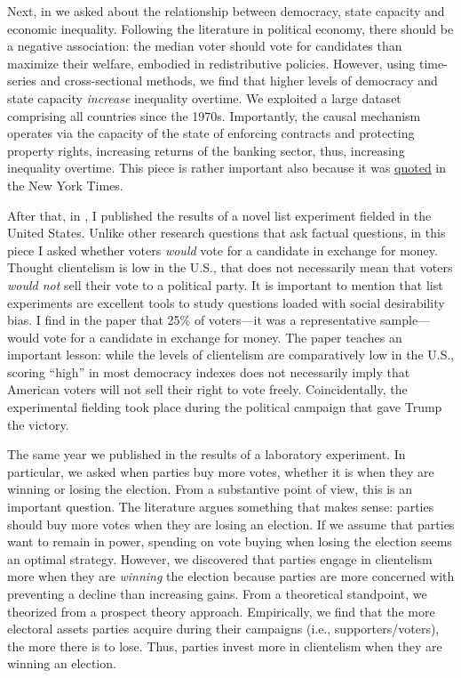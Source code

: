 \documentclass[10pt,stdletter,dateno,sigleft]{newlfm} %
\begin{document}
\begin{newlfm}
Next, in \href{https://doi.org/10.1016/j.ejpoleco.2021.102048}{\textcite{Bahamonde2021a}} we asked about the relationship between democracy, state capacity and economic inequality. Following the literature in political economy, there should be a negative association: the median voter should vote for candidates than maximize their welfare, embodied in redistributive policies. However, using time-series and cross-sectional methods, we find that higher levels of democracy and state capacity \emph{increase} inequality overtime. We exploited a large dataset comprising all countries since the 1970s. Importantly, the causal mechanism operates via the capacity of the state of enforcing contracts and protecting property rights, increasing returns of the banking sector, thus, increasing inequality overtime. This piece is rather important also because it was \href{https://www.nytimes.com/2021/08/04/opinion/biden-eviction-covid-democrats.html}{quoted} in the New York Times. 

After that, in \href{https://link.springer.com/article/10.1057/s41269-020-00174-4}{\textcite{Bahamonde2020a}}, I published the results of a novel list experiment fielded in the United States. Unlike other research questions that ask factual questions, in this piece I asked whether voters \emph{would} vote for a candidate in exchange for money. Thought clientelism is low in the U.S., that does not necessarily mean that voters \emph{would not} sell their vote to a political party. It is important to mention that list experiments are excellent tools to study questions loaded with social desirability bias. I find in the paper that 25\% of voters---it was a representative sample---would vote for a candidate in exchange for money. The paper teaches an important lesson: while the levels of clientelism are comparatively low in the U.S., scoring ``high'' in most democracy indexes does not necessarily imply that American voters will not sell their right to vote freely. Coincidentally, the experimental fielding took place during the political campaign that gave Trump the victory.


The same year we published in \href{https://doi.org/10.1016/j.electstud.2022.102497}{\textcite{Bahamonde2022b}} the results of a laboratory experiment. In particular, we asked when parties buy more votes, whether it is when they are winning or losing the election. From a substantive point of view, this is an important question. The literature argues something that makes sense: parties should buy more votes when they are losing an election. If we assume that parties want to remain in power, spending on vote buying when losing the election seems an optimal strategy. However, we discovered that parties engage in clientelism more when they are \emph{winning} the election because parties are more concerned with preventing a decline than increasing gains. From a theoretical standpoint, we theorized from a prospect theory approach. Empirically, we find that the more electoral assets parties acquire during their campaigns (i.e., supporters/voters), the more there is to lose. Thus, parties invest more in clientelism when they are winning an election. 


\end{newlfm}
\end{document}
